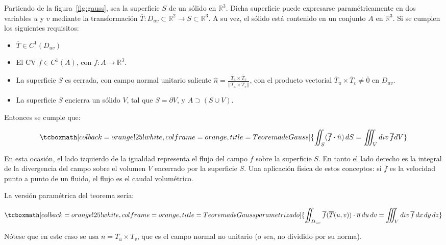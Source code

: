 \documentclass{article}
\renewcommand{\Bbb}{\mathbb}
\begin{document}
Partiendo de la figura~\ref{fig:gauss}, sea la superficie $S$ de un sólido en $\Bbb R^3$. Dicha superficie puede expresarse paramétricamente en dos variables $u$ y $v$ mediante la transformación $\overline{T}:D_{uv} \subset \Bbb R^2 \rightarrow S \subset \Bbb R^3$. A su vez, el sólido está contenido en un conjunto $A$ en $\Bbb R^3$. Si se cumplen los siguientes requisitos:

\begin{itemize}
\item $\overline{T} \in C^1(D_{uv})$
\item El CV $\overline{f} \in C^1(A)$, con $\overline{f}: A \rightarrow \Bbb R^3$.
\item La superficie $S$ es cerrada, con campo normal unitario saliente $\hat{n} = \frac{\overline{T}_u \times \overline{T}_v}{||\overline{T}_u \times \overline{T}_v||}$, con el producto vectorial $\overline{T}_u \times \overline{T}_v \neq \overline{0}$ en $D_{uv}$.
\item La superficie $S$ encierra un sólido $V$, tal que $S = \partial V$, y $A \supset (S \cup V)$.
\end{itemize}

Entonces se cumple que:

\begin{equation}
\tcboxmath[colback=orange!25!white,colframe=orange, title=Teorema de Gauss]
{ \iint_S ( \overline{f} \cdot \hat{n} ) \mathop{dS} = \iiint_V \mathop{div} \overline{f} dV }
\end{equation}

En esta ocasión, el lado izquierdo de la igualdad representa el flujo del campo $\overline{f}$ sobre la superficie $S$. En tanto el lado derecho es la integral de la divergencia del campo sobre el volumen $V$ encerrado por la superficie $S$. Una aplicación física de estos conceptos: si $\overline{f}$ es la velocidad punto a punto de un fluido, el flujo es el caudal volumétrico.

La versión paramétrica del teorema sería:

\begin{equation}
\tcboxmath[colback=orange!25!white,colframe=orange, title=Teorema de Gauss parametrizado]
{ \iint_{D_{uv}} \overline{f}(\overline{T}(u,v)) \cdot \overline{n} \mathop{du} \mathop{dv} = \iiint_V \mathop{div} \overline{f} \mathop{dx} \mathop{dy} \mathop{dz} }
\end{equation}

Nótese que en este caso se usa $\overline{n} = \overline{T}_u \times \overline{T}_v$, que es el campo normal no unitario (o sea, no dividido por su norma).
\end{document}
